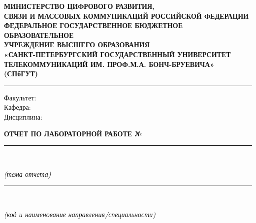 \begin{titlepage}
  \begin{center}
    \onehalfspacing
    \begin{small}
      \singlespacing
      \textbf{МИНИСТЕРСТВО ЦИФРОВОГО РАЗВИТИЯ,\\
      СВЯЗИ И МАССОВЫХ КОММУНИКАЦИЙ РОССИЙСКОЙ ФЕДЕРАЦИИ}\\
      \bigskip
      \textbf{ФЕДЕРАЛЬНОЕ ГОСУДАРСТВЕННОЕ БЮДЖЕТНОЕ ОБРАЗОВАТЕЛЬНОЕ\\
      УЧРЕЖДЕНИЕ ВЫСШЕГО ОБРАЗОВАНИЯ\\
      «САНКТ-ПЕТЕРБУРГСКИЙ ГОСУДАРСТВЕННЫЙ УНИВЕРСИТЕТ\\
      ТЕЛЕКОММУНИКАЦИЙ ИМ. ПРОФ.М.А. БОНЧ-БРУЕВИЧА»\\
      (СПбГУТ)}
    \end{small}

    \textcolor[RGB]{160,160,160}{\rule{\textwidth}{0.5pt}}

    Факультет: \underline{\smash{\faculty}}\\
    Кафедра: \underline{\smash{\department}}\\
    Дисциплина: \underline{\smash{\subject}}\\

    \vspace{3em}

    \textbf{ОТЧЕТ ПО ЛАБОРАТОРНОЙ РАБОТЕ №\labnumber}

    \vspace{4em}

     \topic
     \vspace{-3ex}
     \rule{\textwidth}{0.5pt}\\
     \vspace{-2ex}
     \begin{footnotesize}
       \textit{(тема отчета)}
     \end{footnotesize}

    \vspace{1em}


     \specialty
     \vspace{-3ex}
     \rule{\textwidth}{0.5pt}\\
     \vspace{-2ex}
     \begin{footnotesize}
        \textit{(код и наименование направления/специальности)}
     \end{footnotesize}


\end{center}
\end{titlepage}
